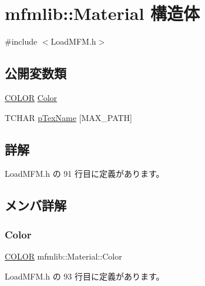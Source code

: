 \hypertarget{structmfmlib_1_1_material}{}\section{mfmlib\+:\+:Material 構造体}
\label{structmfmlib_1_1_material}


{\ttfamily \#include $<$Load\+M\+F\+M.\+h$>$}

\subsection*{公開変数類}
\begin{DoxyCompactItemize}
\item 
\mbox{\hyperlink{structmfmlib_1_1_c_o_l_o_r}{C\+O\+L\+OR}} \mbox{\hyperlink{structmfmlib_1_1_material_a620cca0ff3e33693e771d703704a6086}{Color}}
\item 
T\+C\+H\+AR \mbox{\hyperlink{structmfmlib_1_1_material_a10b07a0cae5af3ec9f47d5da4a8d35e2}{p\+Tex\+Name}} \mbox{[}M\+A\+X\+\_\+\+P\+A\+TH\mbox{]}
\end{DoxyCompactItemize}


\subsection{詳解}


 Load\+M\+F\+M.\+h の 91 行目に定義があります。



\subsection{メンバ詳解}
\mbox{\label{structmfmlib_1_1_material_a620cca0ff3e33693e771d703704a6086}} 
\subsubsection{\texorpdfstring{Color}{Color}}
{\footnotesize\ttfamily \mbox{\hyperlink{structmfmlib_1_1_c_o_l_o_r}{C\+O\+L\+OR}} mfmlib\+::\+Material\+::\+Color}



 Load\+M\+F\+M.\+h の 93 行目に定義があります。

\mbox{\label{structmfmlib_1_1_material_a10b07a0cae5af3ec9f47d5da4a8d35e2}} 
